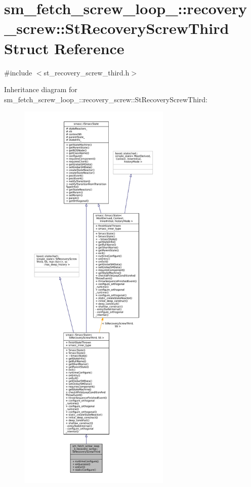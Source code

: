 \hypertarget{structsm__fetch__screw__loop__1_1_1recovery__screw_1_1StRecoveryScrewThird}{}\section{sm\+\_\+fetch\+\_\+screw\+\_\+loop\+\_\+:\+:recovery\+\_\+screw\+:\+:St\+Recovery\+Screw\+Third Struct Reference}
\label{structsm__fetch__screw__loop__1_1_1recovery__screw_1_1StRecoveryScrewThird}


{\ttfamily \#include $<$st\+\_\+recovery\+\_\+screw\+\_\+third.\+h$>$}



Inheritance diagram for sm\+\_\+fetch\+\_\+screw\+\_\+loop\+\_\+:\+:recovery\+\_\+screw\+:\+:St\+Recovery\+Screw\+Third\+:
\nopagebreak
\begin{figure}[H]
\begin{center}
\leavevmode
\includegraphics[height=550pt]{structsm__fetch__screw__loop__1_1_1recovery__screw_1_1StRecoveryScrewThird__inherit__graph}
\end{center}
\end{figure}


